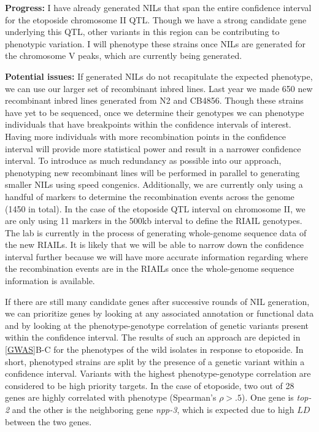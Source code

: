 \documentclass[12pt]{article}
\begin{document}
\vspace{5pt}
{\bf Progress: }I have already generated NILs that span the entire confidence interval for the etoposide chromosome II QTL. Though we have a strong candidate gene underlying this QTL, other variants in this region can be contributing to phenotypic variation. I will phenotype these strains once NILs are generated for the chromosome V peaks, which are currently being generated.


\vspace{5pt}
{\bf Potential issues: }If generated NILs do not recapitulate the expected phenotype, we can use our larger set of recombinant inbred lines. Last year we made 650 new recombinant inbred lines generated from N2 and CB4856. Though these strains have yet to be sequenced, once we determine their genotypes we can phenotype individuals that have breakpoints within the confidence intervals of interest. Having more individuals with more recombination points in the confidence interval will provide more statistical power and result in a narrower confidence interval. To introduce as much redundancy as possible into our approach, phenotyping new recombinant lines will be performed in parallel to generating smaller NILs using speed congenics. Additionally, we are currently only using a handful of markers to determine the recombination events across the genome (1450 in total). In the case of the etoposide QTL interval on chromosome II, we are only using 11 markers in the 500kb interval to define the RIAIL genotypes. The lab is currently in the process of generating whole-genome sequence data of the new RIAILs. It is likely that we will be able to narrow down the confidence interval further because we will have more accurate information regarding where the recombination events are in the RIAILs once the whole-genome sequence information is available.
\vspace{5pt}

If there are still many candidate genes after successive rounds of NIL generation, we can prioritize genes by looking at any associated annotation or functional data and by looking at the phenotype-genotype correlation of genetic variants present within the confidence interval. The results of such an approach are depicted in \autoref{GWAS}B-C for the phenotypes of the wild isolates in response to etoposide. In short, phenotyped strains are split by the presence of a genetic variant within a confidence interval. Variants with the highest phenotype-genotype correlation are considered to be high priority targets. In the case of etoposide, two out of 28 genes are highly correlated with phenotype (Spearman's $\rho > .5$). One gene is {\it top-2} and the other is the neighboring gene {\it npp-3}, which is expected due to high $LD$ between the two genes. 
\vspace{-5pt}
\end{document}
